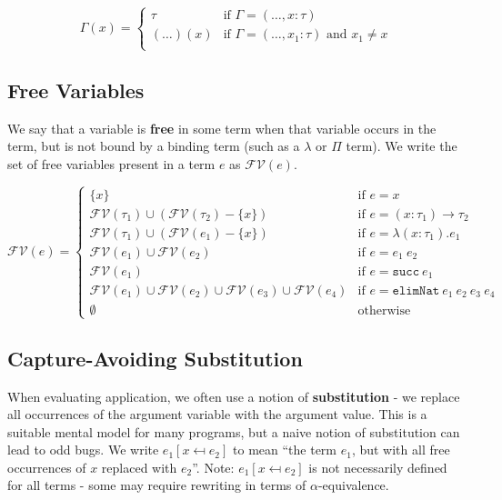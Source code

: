 \documentclass[12pt]{article}
\begin{document}
\begin{equation*}
\Gamma(x) = \begin{cases}
\tau       & \text{if } \Gamma = (\dots, x : \tau) \\
(\dots)(x) & \text{if } \Gamma = (\dots, x_1 : \tau) \text{ and } x_1 \neq x \\
\end{cases}
\end{equation*}

\subsection*{Free Variables}
\label{sec:org6ddeb90}

We say that a variable is \textbf{free} in some term when that variable occurs in the term, but is not bound by a binding term (such as a \(\lambda\) or \(\Pi\) term). We write the set of free variables present in a term \(e\) as \(\mathcal{FV}(e)\).

\begin{equation*}
\mathcal{FV}(e) = \begin{cases}
\{ x \}   & \text{if } e = x \\
\mathcal{FV}(\tau_1) \cup (\mathcal{FV}(\tau_2) - \{ x \})
  &\text{if } e = (x : \tau_1) \rightarrow \tau_2 \\
\mathcal{FV}(\tau_1) \cup (\mathcal{FV}(e_1) - \{ x \})
  &\text{if } e = \lambda (x : \tau_1). e_1 \\
\mathcal{FV}(e_1) \cup \mathcal{FV}(e_2)
  &\text{if } e = e_1\ e_2 \\
\mathcal{FV}(e_1) 
  &\text{if } e = \mathtt{succ}\ e_1 \\
\mathcal{FV}(e_1)
  \cup \mathcal{FV}(e_2)
  \cup \mathcal{FV}(e_3)
  \cup \mathcal{FV}(e_4)
  &\text{if } e = \mathtt{elimNat}\ e_1\ e_2\ e_3\ e_4 \\
\emptyset & \text{otherwise}
\end{cases}
\end{equation*}

\subsection*{Capture-Avoiding Substitution}
\label{sec:org495e7e6}

When evaluating application, we often use a notion of \textbf{substitution} - we replace all occurrences of the argument variable with the argument value. This is a suitable mental model for many programs, but a naive notion of substitution can lead to odd bugs. We write \(e_1[x \mapsfrom{} e_2]\) to mean ``the term \(e_1\), but with all free occurrences of \(x\) replaced with \(e_2\)''. Note: \(e_1 [ x \mapsfrom e_2 ]\) is not necessarily defined for all terms - some may require rewriting in terms of \(\alpha\)-equivalence.
\end{document}
